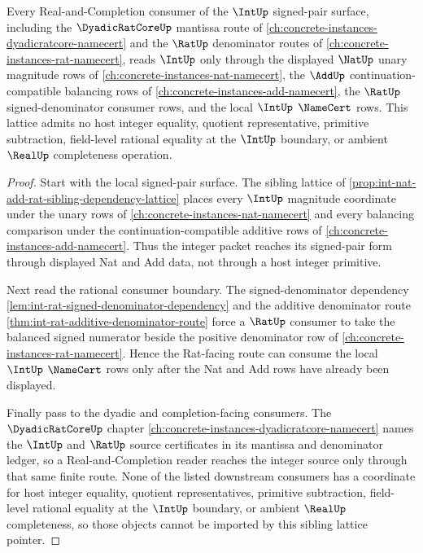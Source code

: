 \begin{theorem}
\label{thm:int-sibling-lattice-pointer}
Every Real-and-Completion consumer of the $\IntUp$ signed-pair surface,
including the $\DyadicRatCoreUp$ mantissa route of
\autoref{ch:concrete-instances-dyadicratcore-namecert} and the $\RatUp$
denominator routes of \autoref{ch:concrete-instances-rat-namecert}, reads
$\IntUp$ only through the displayed $\NatUp$ unary magnitude rows of
\autoref{ch:concrete-instances-nat-namecert}, the $\AddUp$
continuation-compatible balancing rows of
\autoref{ch:concrete-instances-add-namecert}, the $\RatUp$
signed-denominator consumer rows, and the local $\IntUp$ $\NameCert$ rows.
This lattice admits no host integer equality, quotient representative,
primitive subtraction, field-level rational equality at the $\IntUp$ boundary,
or ambient $\RealUp$ completeness operation.
\end{theorem}
\begin{proof}
Start with the local signed-pair surface. The sibling lattice of
\autoref{prop:int-nat-add-rat-sibling-dependency-lattice} places every
$\IntUp$ magnitude coordinate under the unary rows of
\autoref{ch:concrete-instances-nat-namecert} and every balancing comparison
under the continuation-compatible additive rows of
\autoref{ch:concrete-instances-add-namecert}. Thus the integer packet reaches
its signed-pair form through displayed Nat and Add data, not through a host
integer primitive.

Next read the rational consumer boundary. The signed-denominator dependency
\autoref{lem:int-rat-signed-denominator-dependency} and the additive
denominator route \autoref{thm:int-rat-additive-denominator-route} force a
$\RatUp$ consumer to take the balanced signed numerator beside the positive
denominator row of \autoref{ch:concrete-instances-rat-namecert}. Hence the
Rat-facing route can consume the local $\IntUp$ $\NameCert$ rows only after
the Nat and Add rows have already been displayed.

Finally pass to the dyadic and completion-facing consumers. The
$\DyadicRatCoreUp$ chapter \autoref{ch:concrete-instances-dyadicratcore-namecert}
names the $\IntUp$ and $\RatUp$ source certificates in its mantissa and
denominator ledger, so a Real-and-Completion reader reaches the integer source
only through that same finite route. None of the listed downstream consumers
has a coordinate for host integer equality, quotient representatives,
primitive subtraction, field-level rational equality at the $\IntUp$ boundary,
or ambient $\RealUp$ completeness, so those objects cannot be imported by this
sibling lattice pointer.
\end{proof}
